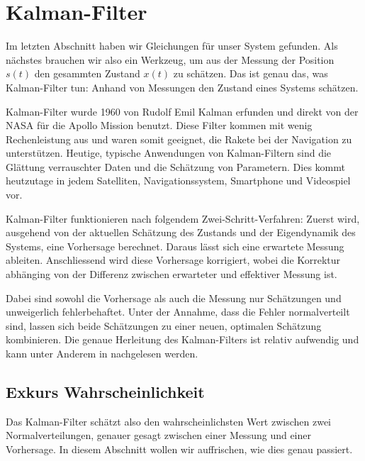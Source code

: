 %
%
%
%
%

\section{Kalman-Filter}
Im letzten Abschnitt haben wir Gleichungen für unser System gefunden.
Als nächstes brauchen wir also ein Werkzeug,
um aus der Messung der Position $s(t)$ den gesammten Zustand $x(t)$ zu schätzen.
Das ist genau das, was Kalman-Filter tun:
Anhand von Messungen den Zustand eines Systems schätzen.

Kalman-Filter wurde 1960 von Rudolf Emil Kalman erfunden und direkt von der NASA für die Apollo Mission benutzt.
%
%
%
Diese Filter kommen mit wenig Rechenleistung aus und waren somit geeignet, die Rakete bei der Navigation zu unterstützen. 
%
Heutige, typische Anwendungen von Kalman-Filtern sind die Glättung verrauschter Daten und die Schätzung von Parametern.
Dies kommt heutzutage in jedem Satelliten, Navigationssystem, Smartphone und Videospiel vor.
%
%
%
%

Kalman-Filter funktionieren nach folgendem Zwei-Schritt-Verfahren:
%
Zuerst wird,
ausgehend von der aktuellen Schätzung des Zustands und der Eigendynamik des Systems,
eine Vorhersage berechnet.
Daraus lässt sich eine erwartete Messung ableiten.
Anschliessend wird diese Vorhersage korrigiert,
wobei die Korrektur abhänging von der Differenz zwischen erwarteter und effektiver Messung ist.

Dabei sind sowohl die Vorhersage als auch die Messung nur Schätzungen und unweigerlich fehlerbehaftet.
Unter der Annahme, dass die Fehler normalverteilt sind,
%
lassen sich beide Schätzungen zu einer neuen, optimalen Schätzung kombinieren.
Die genaue Herleitung des Kalman-Filters ist relativ aufwendig
und kann unter Anderem in \cite{erdbeben:skript:wrstat} nachgelesen werden.

\subsection{Exkurs Wahrscheinlichkeit} 
\label{erdbeben:Wahrscheindlichkeit} 
Das Kalman-Filter schätzt also den wahrscheinlichsten Wert zwischen zwei Normalverteilungen,
genauer gesagt zwischen einer Messung und einer Vorhersage.
In diesem Abschnitt wollen wir auffrischen, wie dies genau passiert.

